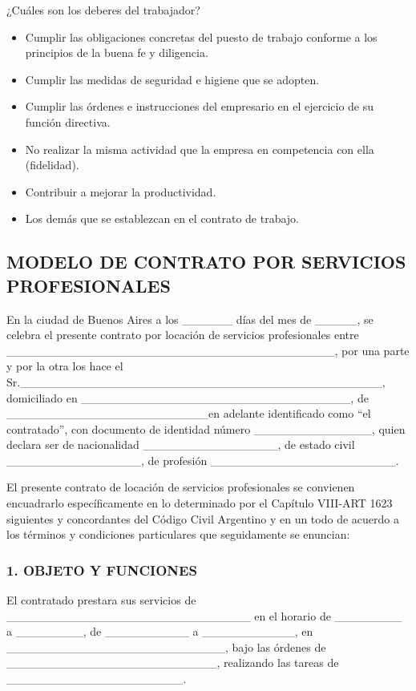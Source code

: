 
¿Cuáles son los deberes del trabajador?

\begin{itemize}
  \item Cumplir las obligaciones concretas del puesto de trabajo conforme a los principios de la buena fe y diligencia.
  \item Cumplir las medidas de seguridad e higiene que se adopten.
  \item Cumplir las órdenes e instrucciones del empresario en el ejercicio de su función directiva.
  \item No realizar la misma actividad que la empresa en competencia con ella (fidelidad).
  \item Contribuir a mejorar la productividad.
  \item Los demás que se establezcan en el contrato de trabajo.
\end{itemize}
\subsection*{MODELO DE CONTRATO POR SERVICIOS PROFESIONALES}
En la ciudad de Buenos Aires a los \_\_\_\_\_\_ días del mes de \_\_\_\_\_, se celebra el presente contrato por locación de servicios profesionales entre \_\_\_\_\_\_\_\_\_\_\_\_\_\_\_\_\_\_\_\_\_\_\_\_\_\_\_\_\_\_\_\_\_\_\_\_\_\_\_, por una parte y por la otra los hace el Sr.\_\_\_\_\_\_\_\_\_\_\_\_\_\_\_\_\_\_\_\_\_\_\_\_\_\_\_\_\_\_\_\_\_\_\_\_\_\_\_\_\_\_\_, domiciliado en \_\_\_\_\_\_\_\_\_\_\_\_\_\_\_\_\_\_\_\_\_\_\_\_\_\_\_\_\_\_\_\_, de \_\_\_\_\_\_\_\_\_\_\_\_\_\_\_\_\_\_\_\_\_\_\_\_en adelante identificado como “el contratado”, con documento de identidad número \_\_\_\_\_\_\_\_\_\_\_\_\_\_, quien declara ser de nacionalidad \_\_\_\_\_\_\_\_\_\_\_\_\_\_\_\_, de estado civil \_\_\_\_\_\_\_\_\_\_\_\_\_\_\_\_, de profesión \_\_\_\_\_\_\_\_\_\_\_\_\_\_\_\_\_\_\_\_\_\_.

El presente contrato de locación de servicios profesionales se convienen encuadrarlo específicamente en lo determinado por el Capítulo VIII-ART 1623 siguientes y concordantes del Código Civil Argentino y en un todo de acuerdo a los términos y condiciones particulares que seguidamente se enuncian:

\subsubsection*{1. OBJETO Y FUNCIONES}
El contratado prestara sus servicios de \_\_\_\_\_\_\_\_\_\_\_\_\_\_\_\_\_\_\_\_\_\_\_\_\_\_\_\_\_ en el horario de \_\_\_\_\_\_\_\_ a \_\_\_\_\_\_\_\_, de \_\_\_\_\_\_\_\_\_\_ a \_\_\_\_\_\_\_\_\_\_\_, en \_\_\_\_\_\_\_\_\_\_\_\_\_\_\_\_\_\_\_\_\_\_\_\_\_\_, bajo las órdenes de \_\_\_\_\_\_\_\_\_\_\_\_\_\_\_\_\_\_\_\_\_\_\_\_\_, realizando las tareas de \_\_\_\_\_\_\_\_\_\_\_\_\_\_\_\_\_\_\_\_\_.

